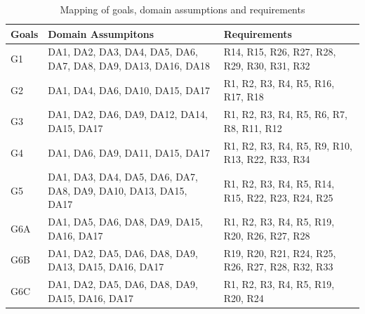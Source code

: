 \begin{table}[ht]

\begin{center}

\begin{tabular}{|p{2cm}|p{4cm}|p{4cm}|}
    
    \toprule
   Goals & Domain Assumpitons & Requirements \\
   \midrule
    G1 & DA1, DA2, DA3, DA4, DA5, DA6, DA7, DA8, DA9, DA13, DA16, DA18 & R14, R15, R26, R27, R28, R29, R30, R31, R32 \\ 
    \midrule
    G2 & DA1, DA4, DA6, DA10, DA15, DA17 & R1, R2, R3, R4, R5, R16, R17, R18 \\
    \midrule
    G3 & DA1, DA2, DA6, DA9, DA12, DA14, DA15, DA17 & R1, R2, R3, R4, R5, R6, R7, R8, R11, R12 \\
    \midrule
    G4 & DA1, DA6, DA9, DA11, DA15, DA17 & R1, R2, R3, R4, R5, R9, R10, R13, R22, R33, R34 \\
    \midrule
    G5 & DA1, DA3, DA4, DA5, DA6, DA7, DA8, DA9, DA10, DA13, DA15, DA17 & R1, R2, R3, R4, R5, R14, R15, R22, R23, R24, R25 \\
    \midrule
    G6A & DA1, DA5, DA6, DA8, DA9, DA15, DA16, DA17 & R1, R2, R3, R4, R5, R19, R20, R26, R27, R28 \\
    \midrule
    G6B & DA1, DA2, DA5, DA6, DA8, DA9, DA13, DA15, DA16, DA17 & R19, R20, R21, R24, R25, R26, R27, R28, R32, R33 \\
    \midrule
    G6C & DA1, DA2, DA5, DA6, DA8, DA9, DA15, DA16, DA17 & R1, R2, R3, R4, R5, R19, R20, R24 \\
    \bottomrule
\end{tabular}
\end{center}
\caption{Mapping of goals, domain assumptions and requirements}
\end{table}



